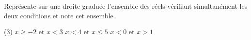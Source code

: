 %
%
    Représente sur une droite graduée l'ensemble des réels vérifiant simultanément les deux conditions et note cet ensemble.
    \begin{tasks}(3)
        \task $x \ge -2$ et $x<3$
        \task $x < 4 $ et $x\le 5$
        \task $x < 0$ et $x >1$
    \end{tasks}
